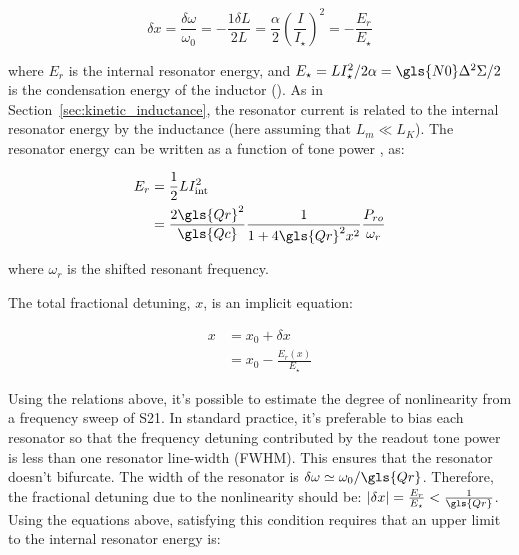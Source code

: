 \begin{equation}
  \delta x = \frac{\delta \omega}{\omega_{0}} = -\frac{1\delta L}{2L} = \frac{\alpha}{2}\left( \frac{I}{I_{\star}} \right)^{2} = -\frac{E_{r}}{E_{\star}}
\end{equation}

where $E_{r}$ is the internal resonator energy, and $E_{\star} = LI_{\star}^{2}/2\alpha = \gls{N0} \Delta^{2} \Sigma/2$ is the condensation energy of the inductor (\citet{mauskopf2018transition,tinkham2004introduction}). As in Section~\ref{sec:kinetic_inductance}, the resonator current is related to the internal resonator energy by the inductance (here assuming that $L_{m} \ll L_{K}$). The resonator energy can be written as a function of tone power \citep{swenson2013operation}, as:

\begin{equation}
 \begin{aligned}
  E_{r} &= \frac{1}{2}LI_{\mathrm{int}}^{2}\\
        &= \frac{2\gls{Qr}^{2}}{\gls{Qc}}\frac{1}{1 + 4\gls{Qr}^{2}x^{2}}\frac{P_{ro}}{\omega_{r}}
  \end{aligned}
\end{equation}

where $\omega_{r}$ is the shifted resonant frequency.

The total fractional detuning, $x$, is an implicit equation:

\begin{equation} \label{eq:implicit detuning}
  \begin{aligned}
  x &= x_{0} + \delta x \\
    &= x_{0} -\frac{E_{r}(x)}{E_{\star}}
    \end{aligned}
\end{equation}

Using the relations above, it's possible to estimate the degree of nonlinearity from a frequency sweep of  \gls{S21}. In standard practice, it's preferable to bias each resonator so that the frequency detuning contributed by the readout tone power is less than one resonator line-width (FWHM). This ensures that the resonator doesn't bifurcate. The width of the resonator is $\delta \omega \simeq \omega_{0}/\gls{Qr}$. Therefore, the fractional detuning due to the nonlinearity should be: $\left| \delta x \right| = \frac{E_{r}}{E_{\star}} < \frac{1}{\gls{Qr}}$. Using the equations above, satisfying this condition requires that an upper limit to the internal resonator energy is:

